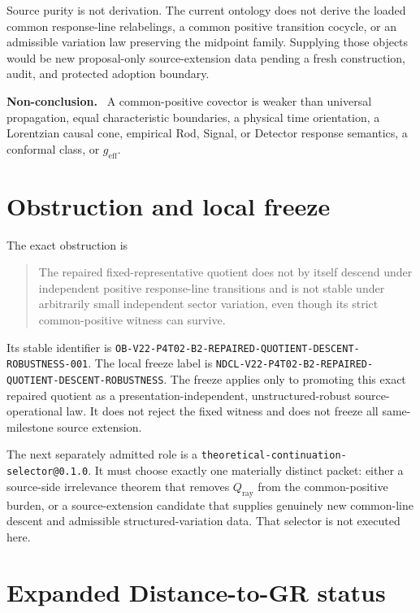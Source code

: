 \documentclass[11pt]{article}
\newenvironment{nonconclusion}{\par\smallskip\noindent\textbf{Non-conclusion.}\ }{\par\smallskip}
\newcommand{\Qray}{Q_{\mathrm{ray}}}
\begin{document}
Source purity is not derivation.  The current ontology does not derive the
loaded common response-line relabelings, a common positive transition cocycle,
or an admissible variation law preserving the midpoint family.  Supplying
those objects would be new proposal-only source-extension data pending a fresh
construction, audit, and protected adoption boundary.

\begin{nonconclusion}
A common-positive covector is weaker than universal propagation, equal
characteristic boundaries, a physical time orientation, a Lorentzian causal
cone, empirical Rod, Signal, or Detector response semantics, a conformal
class, or $g_{\mathrm{eff}}$.
\end{nonconclusion}

\section{Obstruction and local freeze}

The exact obstruction is
\begin{quote}
The repaired fixed-representative quotient does not by itself descend under
independent positive response-line transitions and is not stable under
arbitrarily small independent sector variation, even though its strict
common-positive witness can survive.
\end{quote}

Its stable identifier is
\texttt{OB-V22-P4T02-B2-REPAIRED-QUOTIENT-DESCENT-ROBUSTNESS-001}.
The local freeze label is
\texttt{NDCL-V22-P4T02-B2-REPAIRED-QUOTIENT-DESCENT-ROBUSTNESS}.
The freeze applies only to promoting this exact repaired quotient as a
presentation-independent, unstructured-robust source-operational law.  It does
not reject the fixed witness and does not freeze all same-milestone source
extension.

The next separately admitted role is a
\texttt{theoretical-continuation-selector@0.1.0}.  It must choose exactly one
materially distinct packet: either a source-side irrelevance theorem that
removes $\Qray$ from the common-positive burden, or a source-extension
candidate that supplies genuinely new common-line descent and admissible
structured-variation data.  That selector is not executed here.

\section{Expanded Distance-to-GR status}
\end{document}
